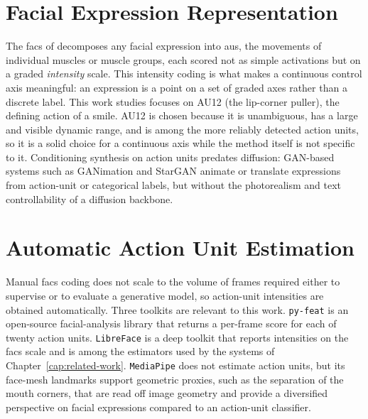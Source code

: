 \section{Facial Expression Representation}\label{sec:bg-facs}


The \gls{facs} of \citet{ekman1978facs} decomposes any facial expression into \glspl{au}, the
movements of individual muscles or muscle groups, each scored not as simple activations but on
a graded \emph{intensity} scale. This intensity coding is what makes a continuous control axis
meaningful: an expression is a point on a set of graded axes rather than a discrete label. This
work studies focuses on AU12 (the lip-corner puller), the defining action of a smile. AU12
is chosen because it is unambiguous, has a large and visible dynamic range, and is among the more
reliably detected action units, so it is a solid choice for a continuous axis while the method
itself is not specific to it. Conditioning synthesis on action units predates diffusion: GAN-based
systems such as GANimation \citep{pumarola2018ganimation} and StarGAN \citep{choi2018stargan}
animate or translate expressions from action-unit or categorical labels, but without the
photorealism and text controllability of a diffusion backbone.

\section{Automatic Action Unit Estimation}\label{sec:bg-au-estimation}

Manual \gls{facs} coding does not scale to the volume of frames required either to supervise or
to evaluate a generative model, so action-unit intensities are obtained automatically. Three
toolkits are relevant to this work. \texttt{py-feat} \citep{cheong2023pyfeat} is an open-source
facial-analysis library that returns a per-frame score for each of twenty action units.
\texttt{LibreFace} \citep{chang2024libreface} is a deep toolkit that reports intensities on the \gls{facs}
scale and is among the estimators used by the systems of Chapter~\ref{cap:related-work}.
\texttt{MediaPipe} \citep{lugaresi2019mediapipe} does not estimate action units, but its face-mesh
landmarks support geometric proxies, such as the separation of the mouth corners, that are read
off image geometry and provide a diversified perspective on facial expressions compared to an action-unit classifier.

